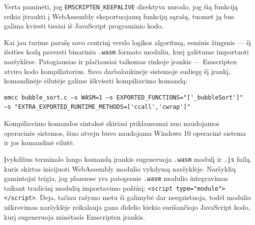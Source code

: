 \documentclass{VUMIFPSkursinis}
\begin{document}
Verta paminėti, jog \verb|EMSCRIPTEN_KEEPALIVE| direktyva nurodo, jog šią funkciją reikia įtraukti į WebAssembly eksportuojamų funkcijų sąrašą, tuomet ją bus galima kviesti tiesiai iš JavaScript programinio kodo. \cite{EMD17}

Kai jau turime parašę savo centrinį verslo logikos algoritmą, esminis žingsnis — šį išeities kodą paversti binariniu \verb|.wasm| formato moduliu, kurį galėtume importuoti naršyklėse. Patogiausias ir plačiausiai taikomas rinkoje įrankis — Emscripten atviro kodo kompiliatorius. Savo darbalaukinėje sistemoje sudiegę šį įrankį, komandinėje eilutėje galime iškviesti kompiliavimo komandą:

\begin{center}
\begin{small}
\begin{verbatim}
emcc bubble_sort.c —s WASM=1 —s EXPORTED_FUNCTIONS="['_bubbleSort']" 
—s "EXTRA_EXPORTED_RUNTIME_METHODS=['ccall','cwrap']"
\end{verbatim}
\end{small}
\end{center}

Kompiliavimo komandos sintaksė skiriasi priklausomai nuo naudojamos operacinės sistemos, šiuo atveju buvo naudojama Windows 10 operacinė sistema ir jos komandinė eilutė.

Įvykdžius terminalo lango komandą įrankis sugeneruoja \verb|.wasm| modulį ir \verb|.js| failą, kuris skirtas inicijuoti WebAssembly modulio vykdymą naršyklėje. Naršyklių gamintojai teigia, jog planuose yra patogesnis \verb|.wasm| modulio integravimas taikant tradicinį modulių importavimo požiūrį: \verb|<script type="module"></script>|. Deja, tačiau rašymo metu ši galimybė dar neegzistuoja, todėl modulio užkrovimas naršyklėje reikalauja gana didelio kiekio surišančiojo JavaScript kodo, kurį sugeneruoja minėtasis Emscripten įrankis.
\end{document}
